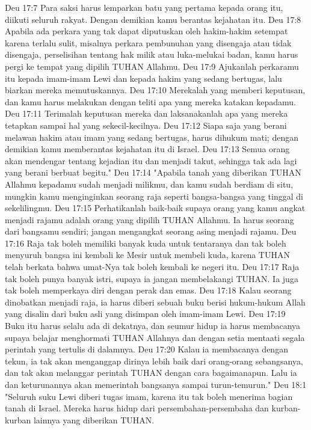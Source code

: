 Deu 17:7  Para saksi harus lemparkan batu yang pertama kepada orang itu, diikuti seluruh rakyat. Dengan demikian kamu berantas kejahatan itu.
Deu 17:8  Apabila ada perkara yang tak dapat diputuskan oleh hakim-hakim setempat karena terlalu sulit, misalnya perkara pembunuhan yang disengaja atau tidak disengaja, perselisihan tentang hak milik atau luka-melukai badan, kamu harus pergi ke tempat yang dipilih TUHAN Allahmu.
Deu 17:9  Ajukanlah perkaramu itu kepada imam-imam Lewi dan kepada hakim yang sedang bertugas, lalu biarkan mereka memutuskannya.
Deu 17:10  Merekalah yang memberi keputusan, dan kamu harus melakukan dengan teliti apa yang mereka katakan kepadamu.
Deu 17:11  Terimalah keputusan mereka dan laksanakanlah apa yang mereka tetapkan sampai hal yang sekecil-kecilnya.
Deu 17:12  Siapa saja yang berani melawan hakim atau imam yang sedang bertugas, harus dihukum mati; dengan demikian kamu memberantas kejahatan itu di Israel.
Deu 17:13  Semua orang akan mendengar tentang kejadian itu dan menjadi takut, sehingga tak ada lagi yang berani berbuat begitu."
Deu 17:14  "Apabila tanah yang diberikan TUHAN Allahmu kepadamu sudah menjadi milikmu, dan kamu sudah berdiam di situ, mungkin kamu menginginkan seorang raja seperti bangsa-bangsa yang tinggal di sekelilingmu.
Deu 17:15  Perhatikanlah baik-baik supaya orang yang kamu angkat menjadi rajamu adalah orang yang dipilih TUHAN Allahmu. Ia harus seorang dari bangsamu sendiri; jangan mengangkat seorang asing menjadi rajamu.
Deu 17:16  Raja tak boleh memiliki banyak kuda untuk tentaranya dan tak boleh menyuruh bangsa ini kembali ke Mesir untuk membeli kuda, karena TUHAN telah berkata bahwa umat-Nya tak boleh kembali ke negeri itu.
Deu 17:17  Raja tak boleh punya banyak istri, supaya ia jangan membelakangi TUHAN. Ia juga tak boleh memperkaya diri dengan perak dan emas.
Deu 17:18  Kalau seorang dinobatkan menjadi raja, ia harus diberi sebuah buku berisi hukum-hukum Allah yang disalin dari buku asli yang disimpan oleh imam-imam Lewi.
Deu 17:19  Buku itu harus selalu ada di dekatnya, dan seumur hidup ia harus membacanya supaya belajar menghormati TUHAN Allahnya dan dengan setia mentaati segala perintah yang tertulis di dalamnya.
Deu 17:20  Kalau ia membacanya dengan tekun, ia tak akan menganggap dirinya lebih baik dari orang-orang sebangsanya, dan tak akan melanggar perintah TUHAN dengan cara bagaimanapun. Lalu ia dan keturunannya akan memerintah bangsanya sampai turun-temurun."
Deu 18:1  "Seluruh suku Lewi diberi tugas imam, karena itu tak boleh menerima bagian tanah di Israel. Mereka harus hidup dari persembahan-persembaha dan kurban-kurban lainnya yang diberikan TUHAN.
